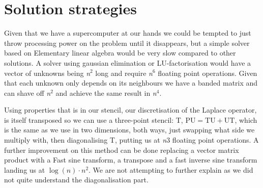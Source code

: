 \newpage
\section{Solution strategies}
Given that we have a supercomputer at our hands we could be tempted to just
throw processing power on the problem until it disappears, but a simple solver
based on Elementary linear algebra would be very slow compared to other
solutions. A solver using gaussian elimination or LU-factorisation would have a
vector of unknowns being \emph{n}$^2$ long and require \emph{n}$^6$ floating
point operations. Given that each unknown only depends on its neighbours we have
a banded matrix and can shave off \emph{n}$^2$ and achieve the same result in
\emph{n}$^4$. 

Using properties that is in our stencil, our discretisation of the Laplace
operator, is itself transposed so we can use a three-point stencil: T, $\mathrm{PU}=\mathrm{TU+UT}$, which is
the same as we use in two dimensions, both ways, just swapping what side we
multiply with, then diagonalising T, putting us at \emph{n}$3$ floating point
operations. A further improvement on this method can be done replacing a vector
matrix product with a Fast sine transform, a transpose and a fast inverse sine
transform landing us at $\log(n)\cdot n^2$. We are not attempting to further
explain as we did not quite understand the diagonalisation part. 
	
